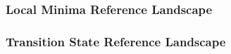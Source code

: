 \documentclass{article}
\begin{document}
\subsubsection{Local Minima Reference Landscape}



\subsubsection{Transition State Reference Landscape}


\newpage 

\end{document}

